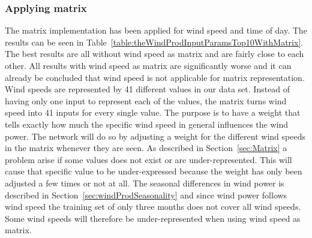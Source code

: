 \subsubsection{Applying matrix}
The matrix implementation has been applied for wind speed and time of day. The results can be seen in Table~\ref{table:theWindProdInputParamsTop10WithMatrix}. The best results are all without wind speed as matrix and are fairly close to each other. All results with wind speed as matrix are significantly worse and it can already be concluded that wind speed is not applicable for matrix representation. Wind speeds are represented by 41 different values in our data set. Instead of having only one input to represent each of the values, the matrix turns wind speed into 41 inputs for every single value. The purpose is to have a weight that tells exactly how much the specific wind speed in general influences the wind power. The network will do so by adjusting a weight for the different wind speeds in the matrix whenever they are seen. As described in Section~\ref{sec:Matrix} a problem arise if some values does not exist or are under-represented. This will cause that specific value to be under-expressed because the weight has only been adjusted a few times or not at all. The seasonal differences in wind power is described in Section~\ref{sec:windProdSeasonality} and since wind power follows wind speed the training set of only three months does not cover all wind speeds. Some wind speeds will therefore be under-represented when using wind speed as matrix. 


